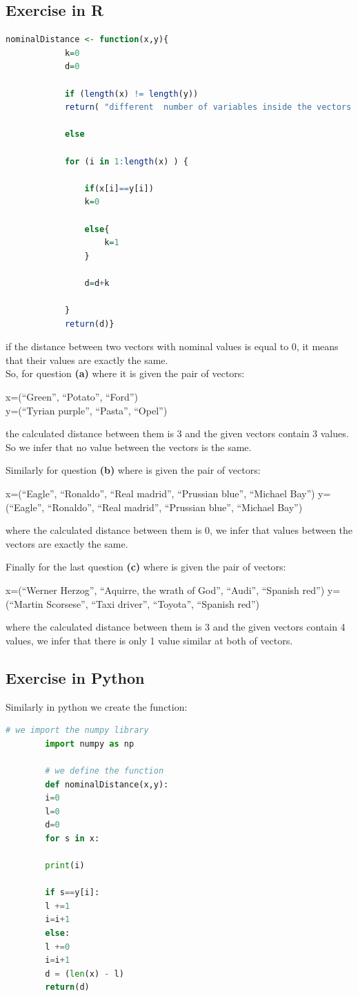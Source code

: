 \documentclass[10pt,a4paper]{article}
\begin{document}
	\subsection{Exercise in R}
	\begin{lstlisting}[language=R]
		nominalDistance <- function(x,y){
			k=0
			d=0
			
			if (length(x) != length(y))
			return( "different  number of variables inside the vectors.")
			
			else 
			
			for (i in 1:length(x) ) {
				
				if(x[i]==y[i])
				k=0
				
				else{
					k=1
				}
				
				d=d+k
				
			}
			return(d)}
	\end{lstlisting}
	
	
	if the distance between two vectors with nominal values ​​is equal to 0, it means that their values ​​are exactly the same.
	\\So, for question \textbf{(a)} where it is given the pair of vectors:
	\begin{center} 
		x=(“Green”, “Potato”, “Ford”)
		\\y=(“Tyrian purple”, “Pasta”, “Opel”)
	\end{center}
	the calculated distance  between them is 3 and the given vectors contain 3 values. So we infer that no value between the vectors is the same.
	
	
	Similarly for question \textbf{(b)} where is given the pair of vectors:
	\begin{center} 
		x=(“Eagle”, “Ronaldo”, “Real madrid”, “Prussian blue”, “Michael Bay”) y=(“Eagle”, “Ronaldo”, “Real madrid”, “Prussian blue”, “Michael Bay”)
	\end{center}
	where the calculated distance between them is 0, we infer that values between the vectors are exactly the same.
	
	Finally for the last question \textbf{(c)} where is given the pair of vectors:
	\begin{center}
		x=(“Werner Herzog”, “Aquirre, the wrath of God”, “Audi”, “Spanish red”) y=(“Martin Scorsese”, “Taxi driver”, “Toyota”, “Spanish red”)
	\end{center}
	where the calculated distance  between them is 3 and the given vectors contain 4 values, we infer that there is only 1 value similar at both of vectors. 
	
	\subsection{Exercise in Python}
	Similarly in python we create the function:
	\begin{lstlisting}[language=python]
		# we import the numpy library
		import numpy as np
		
		# we define the function
		def nominalDistance(x,y):
		i=0
		l=0
		d=0
		for s in x:
		
		print(i)
		
		if s==y[i]:
		l +=1
		i=i+1
		else:
		l +=0  
		i=i+1
		d = (len(x) - l)
		return(d)
	\end{lstlisting}
	
\end{document}
